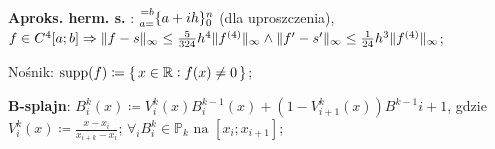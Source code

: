 \entry
\textbf{Aproks. herm. s. \mancube}:
$\ipoints[0][n][a=][=b]{a+ih}$
(dla uproszczenia),
$
f\in C^{4}[a;b]
\Rightarrow
\|f-s\|_\infty \leq \frac{5}{324} h^4 \|f^{(4)}\|_\infty
\wedge
\|f'-s'\|_\infty \leq \frac{1}{24} h^3 \|f^{(4)}\|_\infty
$;


\entry
Nośnik:
$\mathrm{supp}(f) \coloneqq \set{x \in \mathbb{R}: f(x) \neq 0}$;

\entry
\textbf{B-splajn}:
$B_i^k(x) \coloneqq V_i^k(x) B_i^{k-1}(x) + (1 - V^k_{i+1}(x)) B^{k-1}{i+1}$,
gdzie
$V_i^k(x) \coloneqq \frac{x-x_i}{x_{i+k} - x_i}$;
\entry
$\forall_i B_i^k \in \mathbb{P}_{k} \text{ na } [x_i; x_{i+1}]$;
